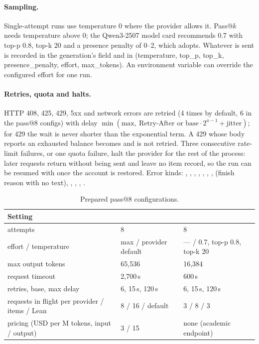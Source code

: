 \documentclass[11pt,a4paper]{article}
\begin{document}
\paragraph{Sampling.} Single-attempt runs use temperature 0 where the provider allows it. Pass@$k$ needs temperature above 0; the Qwen3-2507 model card recommends 0.7 with top-p 0.8, top-k 20 and a presence penalty of 0--2, which  adopts. Whatever is sent is recorded in the generation's  field and in  (temperature, top\_p, top\_k, presence\_penalty, effort, max\_tokens). An environment variable  can override the configured effort for one run.

\paragraph{Retries, quota and halts.} HTTP 408, 425, 429, 5xx and network errors are retried (4 times by default, 6 in the pass@8 configs) with delay $\min(\text{max},\ \text{Retry-After or base}\cdot 2^{a-1} + \text{jitter})$; for 429 the wait is never shorter than the exponential term. A 429 whose body reports an exhausted balance becomes  and is not retried. Three consecutive rate-limit failures, or one quota failure, halt the provider for the rest of the process: later requests return  without being sent and leave no item record, so the run can be resumed with  once the account is restored. Error kinds: , , , , , , ,  (finish reason  with no text), , , , .

\begin{table}[htbp]
\centering\small
\caption{Prepared pass@8 configurations.}
\label{tab:configs}
\begin{tabular}{L{60mm}L{44mm}L{44mm}}
\toprule
Setting &  &  \\
\midrule
attempts & 8 & 8 \\
effort / temperature & max / provider default & --- / 0.7, top-p 0.8, top-k 20 \\
max output tokens & 65,536 & 16,384 \\
request timeout & 2,700\,s & 600\,s \\
retries, base, max delay & 6, 15\,s, 120\,s & 6, 15\,s, 120\,s \\
requests in flight per provider / items / Lean & 8 / 16 / default & 3 / 8 / 3 \\
pricing (USD per M tokens, input / output) & 3 / 15 & none (academic endpoint) \\
\bottomrule
\end{tabular}
\end{table}
\end{document}
